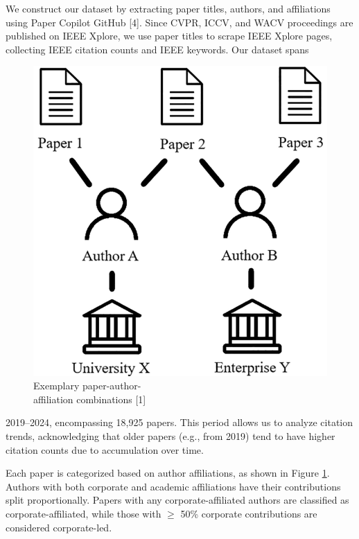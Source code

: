\documentclass{article}
\begin{document}
We construct our dataset by extracting paper titles, authors, and affiliations using Paper Copilot GitHub [4]. Since CVPR, ICCV, and WACV proceedings are published on IEEE Xplore, we use paper titles to scrape IEEE Xplore pages, collecting IEEE citation counts and IEEE keywords. Our dataset spans 
\begin{figure}
\centering
\vspace{-10pt}
\includegraphics[width=.95\linewidth]{report/images/affiliation-combination.png}
\caption{Exemplary paper-author-\\
affiliation combinations [1]}
\label{fig:affiliation-combination}
\vspace{-20pt}
\end{figure}
2019–2024, encompassing 18,925 papers. This period allows us to analyze citation trends, acknowledging that older papers (e.g., from 2019) tend to have higher citation counts due to accumulation over time.

Each paper is categorized based on author affiliations, as shown in Figure \ref{fig:affiliation-combination}. Authors with both corporate and academic affiliations have their contributions split proportionally. Papers with any corporate-affiliated authors are classified as corporate-affiliated, while those with $\geq$ 50\% corporate contributions are considered corporate-led.
\end{document}
